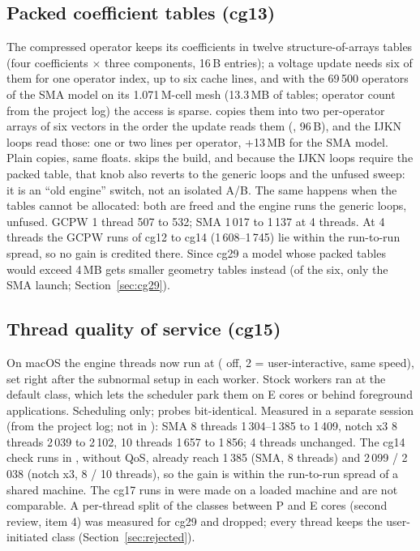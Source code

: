 \subsection{Packed coefficient tables (cg13)}
The compressed operator keeps its coefficients in twelve structure-of-arrays tables (four coefficients $\times$ three
components, 16\,B entries); a voltage update needs six of them for one operator index, up to six cache lines, and with
the 69\,500 operators of the SMA model on its 1.071\,M-cell mesh (13.3\,MB of tables; operator count from the project
log) the access is sparse.
 copies them into two per-operator arrays of six vectors in the order the update
reads them (, 96\,B), and the IJKN loops read those: one or two lines per
operator, +13\,MB for the SMA model. Plain copies, same floats.  skips the build,
and because the IJKN loops require the packed table, that knob also reverts to the generic loops and the unfused
sweep: it is an ``old engine'' switch, not an isolated A/B.
The same happens when the tables cannot be allocated: both are freed and the engine runs the generic loops, unfused.
GCPW 1 thread 507 to 532; SMA 1\,017 to 1\,137 at 4 threads. At 4 threads the GCPW runs of cg12 to cg14
(1\,608--1\,745) lie within the run-to-run spread, so no gain is credited there. Since cg29 a model whose packed tables
would exceed 4\,MB gets smaller geometry tables instead (of the six, only the SMA launch; Section~\ref{sec:cg29}).

\subsection{Thread quality of service (cg15)}
On macOS the engine threads now run at  ( off, 2 =
user-interactive, same speed), set right after the subnormal setup in each worker. Stock workers ran at the default
class, which lets the scheduler park them on E cores or behind foreground applications. Scheduling only; probes
bit-identical. Measured in a separate session (from the project log; not in ): SMA 8 threads
1\,304--1\,385 to 1\,409, notch x3 8 threads 2\,039 to 2\,102, 10 threads 1\,657 to 1\,856; 4 threads unchanged. The
cg14 check runs in , without QoS, already reach 1\,385 (SMA, 8 threads) and 2\,099 / 2\,038 (notch x3,
8 / 10 threads), so the gain is within the run-to-run spread of a shared machine. The cg17 runs in 
were made on a loaded machine and are not comparable. A per-thread split of the classes between P and E cores (second
review, item 4) was measured for cg29 and dropped; every thread keeps the user-initiated class
(Section~\ref{sec:rejected}).

